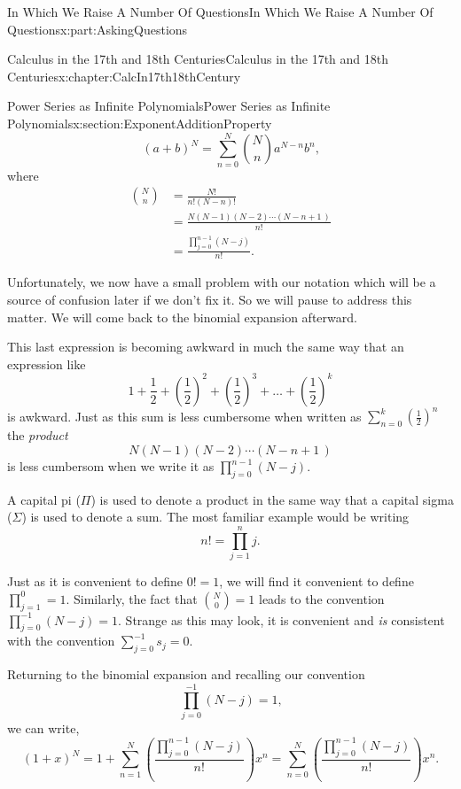 \documentclass[oneside,10pt,]{book}
\numberwithin{equation}{section}
\newcommand{\amp}{&}
\begin{document}
\begin{partptx}{In Which We Raise A Number Of Questions}{}{In Which We Raise A Number Of Questions}{}{}{x:part:AskingQuestions}
\begin{chapterptx}{Calculus in the 17th and 18th Centuries}{}{Calculus in the 17th and 18th Centuries}{}{}{x:chapter:CalcIn17th18thCentury}
\begin{sectionptx}{Power Series as Infinite Polynomials}{}{Power Series as Infinite Polynomials}{}{}{x:section:ExponentAdditionProperty}
\begin{equation*}
\left(a+b\right)^N=\sum_{n=0}^N\binom{N}{n}a^{N-n}b^n\text{,}
\end{equation*}
where%
\begin{align*}
\binom{N}{n}\amp =\frac{N!}{n!\left(N-n\right)!}\\
\amp =\frac{N\left(N-1\right)\left(N-2\right)\cdots\left(N-n+1\,\right)}{n!}\\
\amp =\frac{\prod_{j=0}^{n-1}\left(N-j\right)}{n!}\text{.}
\end{align*}
%
\par
Unfortunately, we now have a small problem with our notation which will be a source of confusion later if we don't fix it. So we will pause to address this matter. We will come back to the binomial expansion afterward.%
\par
This last expression is becoming awkward in much the same way that an expression like%
\begin{equation*}
1+\frac{1}{2}+\left(\frac{1}{2}\right)^2+\left(\frac{1}{2}\right)^3+\ldots+\left(\frac{1}{2}\right)^k
\end{equation*}
is awkward. Just as this sum is less cumbersome when written as \(\sum_{n=0}^k\left(\frac{1}{2}\right)^n\) the \emph{product}%
\begin{equation*}
N\left(N-1\right)\left(N-2\right)\cdots\left(N-n+1\,\right)
\end{equation*}
is less cumbersom when we write it as \(\prod_{j=0}^{n-1}\left(N-j\right)\).%
\par
A capital pi (\(\Pi\)) is used to denote a product in the same way that a capital sigma (\(\Sigma\)) is used to denote a sum. The most familiar example would be writing%
\begin{equation*}
n!=\prod_{j=1}^{n}j\text{.}
\end{equation*}
%
\par
Just as it is convenient to define \(0!=1\), we will find it convenient to define \(\prod_{j=1}^{0}=1\).  Similarly, the fact that \(\binom{N}{0}=1\) leads to the convention \(\prod_{j=0}^{-1}\left(N-j\right)=1\).  Strange as this may look, it is convenient and \emph{is} consistent with the convention \(\sum_{j=0}^{-1}s_j=0\).%
\par
Returning to the binomial expansion and recalling our convention%
\begin{equation*}
\prod_{j=0}^{-1}\left(N-j\right)=1\text{,}
\end{equation*}
we can write,%
\begin{equation*}
\left(1+x\right)^N=1+\sum_{n=1}^N\left(\frac{\prod_{j=0}^{n-1}\left(N-j\right)}{n!}\right)x^n = \sum_{n=0}^N\left(\frac{\prod_{j=0}^{n-1}\left(N-j\right)}{n!}\right)x^n\text{.}

\end{equation*}
\end{sectionptx}
\end{chapterptx}
\end{partptx}
\end{document}
